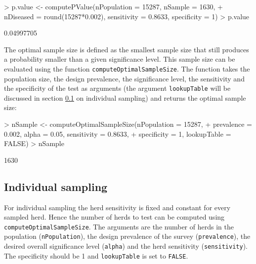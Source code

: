 \documentclass[nojss]{jss}
\begin{document}
\begin{Schunk}
\begin{Sinput}
> p.value <- computePValue(nPopulation = 15287, nSample = 1630, 
+      nDiseased = round(15287*0.002), sensitivity = 0.8633, specificity = 1)
> p.value
\end{Sinput}
\begin{Soutput}
[1] 0.04997705
\end{Soutput}
\end{Schunk}

The optimal sample size is defined as the smallest sample size that 
still produces a probability smaller than a given significance 
level. This sample size can be evaluated using the function 
\texttt{computeOptimalSampleSize}. 
The function takes the 
population size, the design prevalence, the significance level, the 
sensitivity and the specificity of the test as arguments (the 
argument \texttt{lookupTable} will be discussed in section 
\ref{subsec:ind-sampling-noclass} on individual sampling) and 
returns the optimal sample size: 

\begin{Schunk}
\begin{Sinput}
> nSample <- computeOptimalSampleSize(nPopulation = 15287, 
+      prevalence = 0.002, alpha = 0.05, sensitivity = 0.8633, 
+      specificity = 1, lookupTable = FALSE)
> nSample 
\end{Sinput}
\begin{Soutput}
[1] 1630
\end{Soutput}
\end{Schunk}


\subsection{Individual sampling} \label{subsec:ind-sampling-noclass}

For individual sampling the herd sensitivity is fixed and constant 
for every sampled herd. Hence the number of herds to test can be 
computed using \texttt{computeOptimalSampleSize}. The arguments are 
the number of herds in the population (\texttt{nPopulation}), the 
design prevalence of the survey (\texttt{prevalence}), the desired 
overall significance level (\texttt{alpha}) and the herd sensitivity 
(\texttt{sensitivity}). The specificity should be 1 and 
\texttt{lookupTable} is set to \texttt{FALSE}. 
\end{document}
